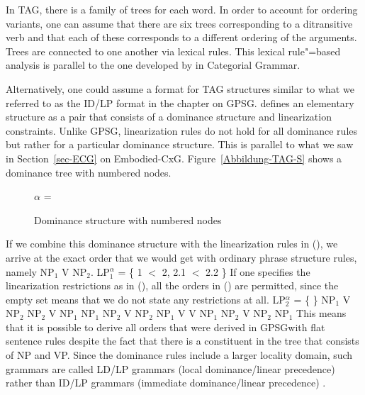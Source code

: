 In TAG, there is a family of trees for each word. In order to account for
ordering variants, one can assume that there are six trees corresponding to a ditransitive verb and
that each of these corresponds to a different ordering of the arguments.  Trees are connected to one
another via lexical rules. This lexical rule"=based analysis is parallel to the one
developed by \citet{Uszkoreit86b} in Categorial Grammar.

Alternatively, one could assume a format for TAG structures similar to what we referred to as the
ID/LP format in the chapter on GPSG. \citet{Joshi87b} defines an elementary
structure as a pair that consists of a dominance structure and linearization constraints.  Unlike
GPSG, linearization rules do not hold for all dominance rules but rather for a particular dominance
structure. This is parallel to what we saw in Section~\ref{sec-ECG} on
Embodied-CxG. Figure~\vref{Abbildung-TAG-S} shows a dominance tree with numbered nodes. 
\begin{figure}
\centerline{%
$\alpha$ = 
}
\caption{\label{Abbildung-TAG-S}Dominance structure with numbered nodes}
\end{figure}%
If we combine this dominance structure with the linearization rules in (), we arrive at the exact order that we would get with
ordinary phrase structure rules, namely NP$_1$ V NP$_2$.
\ea
LP$^\alpha_1$ = \{ 1 $<$ 2, 2.1 $<$ 2.2 \}
\z
If one specifies the linearization restrictions as in (), all the orders in () are permitted, since the empty set means that we do not state any restrictions at all.
\ea
LP$^\alpha_2$ = \{ \}
\z
\eal
\ex NP$_1$ V NP$_2$
\ex NP$_2$ V NP$_1$
\ex NP$_1$ NP$_2$ V 
\ex NP$_2$ NP$_1$ V
\ex V NP$_1$ NP$_2$
\ex V NP$_2$ NP$_1$ 
\zl
This means that it is possible to derive all orders that were derived in GPSG\indexgpsg with flat sentence rules despite the fact that there is
a constituent in the tree that consists of NP and VP. Since the dominance rules include a larger
locality domain, such grammars are called LD/LP grammars (local dominance/linear precedence) rather
than ID/LP grammars (immediate dominance/linear precedence) \citep*{JSW90a-u}.

